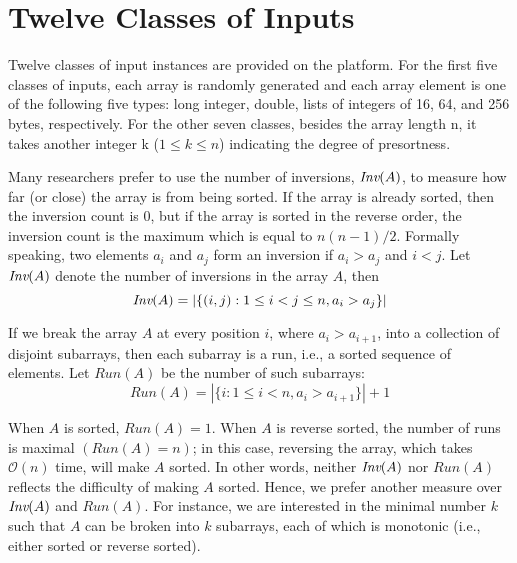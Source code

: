\documentclass[AMA,STIX1COL]{WileyNJD-v2}
\newcommand{\qusort}{\emph{quicksort }}
\newcommand{\msort}{\emph{mergesort }}
\begin{document}

\section{Twelve Classes of Inputs}
Twelve classes of input instances are provided on the platform.
For the first five classes of inputs, each array is randomly generated and each array element is one of the following five types: long integer, double, lists of integers of 16, 64, and 256 bytes, respectively. 
For the other seven classes, besides the array length n, it takes another integer k ($1 \leq k \leq n$) indicating the degree of presortness.  

Many researchers prefer to use the number of inversions, $\mbox{\it Inv}(A)$, 
to measure how far (or close) the array is from being sorted. If the array is already sorted, then the inversion count is 0, but if the array is sorted in the reverse order, the inversion count is the maximum which is equal to $n(n-1)/2$. Formally speaking, two elements $a_i$ and $a_j$ form an inversion if $a_i > a_j$ and $i < j$. Let $\mbox{\it Inv}(A)$ denote the number of inversions in the array $A$, then
\[ \mbox{\it Inv}(A) = | \{(i, j) : 1 \leq i < j \leq n, a_i > a_j\} | \]            

If we break the array $A$ at every position $i$, where $a_i > a_{i+1}$, into a collection of disjoint subarrays, then each subarray is a run, i.e., a sorted sequence of elements.  
Let $Run(A)$ be the number of such subarrays: 
\[ Run(A) = | \{i : 1 \leq i < n, a_i > a_{i+1}\} | + 1 \]     

When $A$ is sorted, $Run(A) = 1$. When $A$ is reverse sorted, the number of runs is maximal $(Run(A) = n)$; in this case, reversing the array, which takes $\mathcal{O}(n)$ time, will make $A$ sorted. 
In other words, neither $\mbox{\it Inv}(A)$ nor $Run(A)$ reflects the difficulty of making $A$ sorted. 
Hence, we prefer another measure over $\mbox{\it Inv}(A)$ and $Run(A)$. 
For instance, we are interested in the minimal number $k$ such that $A$ can be broken into $k$ subarrays, each of which is monotonic (i.e., either sorted or reverse sorted).       
\end{document}
